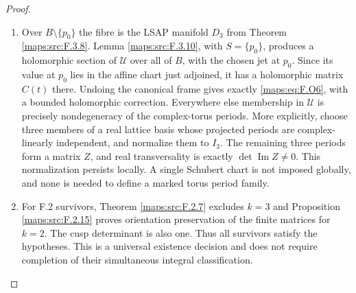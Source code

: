 \documentclass[11pt,a4paper]{article}
\theoremstyle{definition}
\begin{document}
\begin{proof}
\begin{enumerate}[label=\arabic*.]
\item Over $B\setminus\{p_0\}$ the fibre is the LSAP manifold
$D_3$ from Theorem \ref{maps:src:F.3.8}.  Lemma \ref{maps:src:F.3.10}, with $S=\{p_0\}$,
produces a holomorphic section of $\mathscr U$ over all of
$B$, with the chosen jet at $p_0$.  Since its value at $p_0$
lies in the affine chart just adjoined, it has a holomorphic
matrix $C(t)$ there.  Undoing the canonical frame gives
exactly \eqref{maps:eq:F.O6}, with a bounded holomorphic correction.
Everywhere else membership in $\mathscr U$ is precisely
nondegeneracy of the complex-torus periods.
More explicitly, choose three members of a real lattice basis
whose projected periods are complex-linearly independent, and
normalize them to $I_3$.  The remaining three periods form a
matrix $Z$, and real transversality is exactly
$\det\operatorname{Im}Z\ne0$.  This normalization persists
locally.  A single Schubert chart is not imposed globally,
and none is needed to define a marked torus period family.

\item For F.2 survivors, Theorem \ref{maps:src:F.2.7} excludes $k=3$ and
Proposition \ref{maps:src:F.2.15} proves orientation preservation of the
finite matrices for $k=2$.  The cusp determinant is also one.
Thus all survivors satisfy the hypotheses.  This is a
universal existence decision and does not require completion
of their simultaneous integral classification.

\end{enumerate}
\end{proof}
\end{document}
